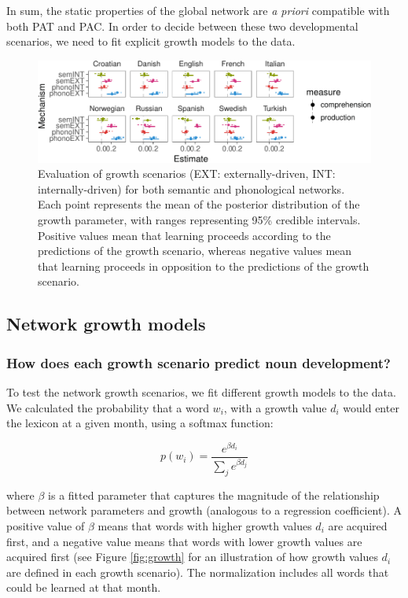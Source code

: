 \documentclass[english,floatsintext,man]{apa6}
\theoremstyle{definition}
\theoremstyle{definition}
\theoremstyle{definition}
\theoremstyle{remark}
\begin{document}
In sum, the static properties of the global network are \emph{a priori}
compatible with both PAT and PAC. In order to decide between these two
developmental scenarios, we need to fit explicit growth models to the
data.

\begin{figure}[!h]
\includegraphics[width=\textwidth]{ms_files/figure-latex/growthPred-1} \caption{Evaluation of growth scenarios (EXT: externally-driven, INT: internally-driven) for both semantic and phonological networks. Each point represents the mean of the posterior distribution of the growth parameter, with ranges representing 95\% credible intervals. Positive values mean that learning proceeds according to the predictions of the growth scenario, whereas negative values mean that learning proceeds in opposition to the predictions of the growth scenario.}\label{fig:growthPred}
\end{figure}

\subsection{Network growth models}\label{network-growth-models}

\subsubsection{How does each growth scenario predict noun
development?}\label{how-does-each-growth-scenario-predict-noun-development}

To test the network growth scenarios, we fit different growth models to
the data. We calculated the probability that a word \(w_i\), with a
growth value \(d_i\) would enter the lexicon at a given month, using a
softmax function:

\begin{equation}
 p(w_i)= \frac{e^{\beta d_i}}{\sum_j e^{\beta d_j} }
\end{equation}

\noindent where \(\beta\) is a fitted parameter that captures the
magnitude of the relationship between network parameters and growth
(analogous to a regression coefficient). A positive value of \(\beta\)
means that words with higher growth values \(d_i\) are acquired first,
and a negative value means that words with lower growth values are
acquired first (see Figure \ref{fig:growth} for an illustration of how
growth values \(d_i\) are defined in each growth scenario). The
normalization includes all words that could be learned at that month.
\end{document}
